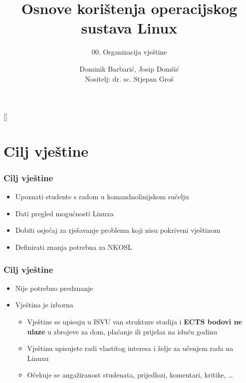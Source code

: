 \documentclass{beamer}
\title{Osnove korištenja operacijskog sustava Linux}
\subtitle{00. Organizacija vještine}
\author[Dominik Barbarić, Josip Domšić]{Dominik Barbarić, Josip Domšić\\{\small Nositelj: dr. sc. Stjepan Groš}}
\institute[FER]{Sveučilište u Zagrebu \\
				Fakultet elektrotehnike i računarstva}
\date{\todayiso}
\begin{document}
{
[] %

\begin{frame}
\maketitle
\end{frame}
}

\section{Cilj vještine}
\begin{frame}[t]
	\frametitle{Cilj vještine}
	\begin{itemize}
		\item Upoznati studente s radom u komandnolinijskom sučelju
		\item Dati pregled mogućnosti Linuxa
		\item Dobiti osjećaj za rješavanje problema koji nisu pokriveni vještinom
		\item Definirati znanja potrebna za NKOSL
	\end{itemize}
\end{frame}

\begin{frame}[t]
	\frametitle{Cilj vještine}
	\begin{itemize}
		\item Nije potrebno predznanje
		\item Vještina je izborna
		\begin{itemize}
			\item Vještine se upisuju u ISVU van strukture studija i \textbf{ECTS bodovi ne ulaze} u zbrojeve za dom, plaćanje ili prijelaz na iduću godinu
			\item Vještinu upisujete radi vlastitog interesa i želje za učenjem rada na Linuxu
			\item Očekuje se angažiranost studenata, prijedlozi, komentari, kritike, \ldots
		\end{itemize}
	\end{itemize}
\end{frame}
\end{document}
